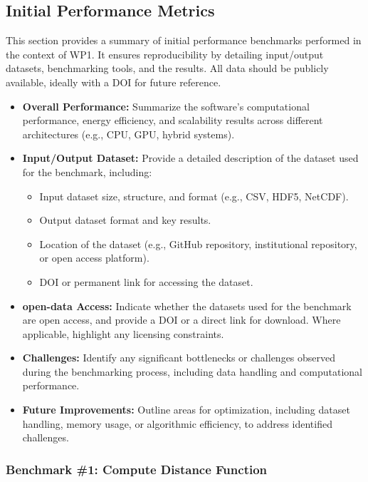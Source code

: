 \subsection{Initial Performance Metrics}
\label{sec:WP1:Feelpp:metrics}

This section provides a summary of initial performance benchmarks performed in the context of WP1. It ensures reproducibility by detailing input/output datasets, benchmarking tools, and the results. All data should be publicly available, ideally with a DOI for future reference.

\begin{itemize}
    \item \textbf{Overall Performance:} Summarize the software's computational performance, energy efficiency, and scalability results across different architectures (e.g., CPU, GPU, hybrid systems).
    \item \textbf{Input/Output Dataset:} Provide a detailed description of the dataset used for the benchmark, including:
        \begin{itemize}
            \item Input dataset size, structure, and format (e.g., CSV, HDF5, NetCDF).
            \item Output dataset format and key results.
            \item Location of the dataset (e.g., GitHub repository, institutional repository, or open access platform).
            \item DOI or permanent link for accessing the dataset.
        \end{itemize}
    \item \textbf{open-data Access:} Indicate whether the datasets used for the benchmark are open access, and provide a DOI or a direct link for download. Where applicable, highlight any licensing constraints.
    \item \textbf{Challenges:} Identify any significant bottlenecks or challenges observed during the benchmarking process, including data handling and computational performance.
    \item \textbf{Future Improvements:} Outline areas for optimization, including dataset handling, memory usage, or algorithmic efficiency, to address identified challenges.
\end{itemize}

\subsubsection{Benchmark \#1: Compute Distance Function}

